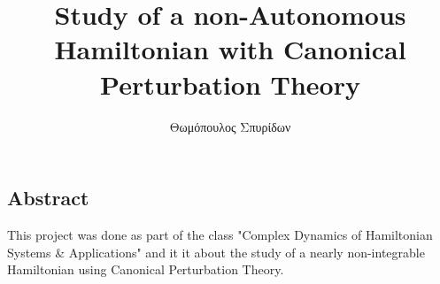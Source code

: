 \documentclass[a4paper,11pt, floatperchapter]{book}
\title{Study of a non-Autonomous Hamiltonian with Canonical Perturbation Theory}
\author{Θωμόπουλος Σπυρίδων}
\begin{document}

	
\begin{changemargin}{2cm}{2cm} 

	\section*{Abstract} 
		This project was done as part of the class "Complex Dynamics of Hamiltonian Systems \& Applications" and it it about the study of a nearly non-integrable Hamiltonian 
		using Canonical Perturbation Theory. 
	\let\cleardoublepage\clearpage
\end{changemargin}



\tableofcontents
\let\cleardoublepage\clearpage



\end{document}
